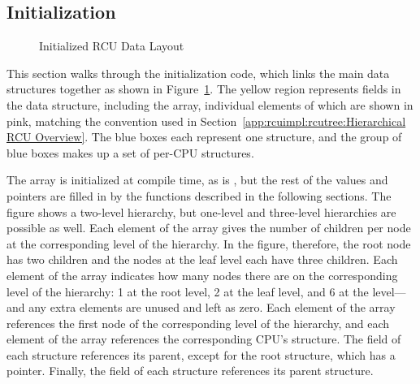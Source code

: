 \subsection{Initialization}
\label{app:rcuimpl:rcutreewt:Initialization}

\begin{figure}[tb]
\begin{center}
\end{center}
\caption{Initialized RCU Data Layout}
\label{fig:app:rcuimpl:rcutree:Initialized RCU Data Layout}
\end{figure}

This section walks through the initialization code, which links the
main data structures together as shown in
Figure~\ref{fig:app:rcuimpl:rcutree:Initialized RCU Data Layout}.
The yellow region represents fields in the  data
structure, including the  array, individual elements
of which are shown in pink, matching the convention used in
Section~\ref{app:rcuimpl:rcutree:Hierarchical RCU Overview}.
The blue boxes each represent one  structure,
and the group of blue boxes makes up a set of per-CPU 
structures.

The  array is initialized at compile time, as is
, but the rest of the values and pointers are filled
in by the functions described in the following sections.
The figure shows a two-level hierarchy, but one-level and three-level
hierarchies are possible as well.
Each element of the  array gives the number of
children per node at the corresponding level of the hierarchy.
In the figure, therefore, the root node has two children and the
nodes at the leaf level each have three children.
Each element of the  array indicates how many nodes
there are on the corresponding level of the hierarchy: 1 at the root
level, 2 at the leaf level, and 6 at the  level---and any
extra elements are unused and left as zero.
Each element of the  array references the first
node of the corresponding level of the  hierarchy,
and each element of the  array references the corresponding
CPU's  structure.
The  field of each  structure references
its parent, except for the root  structure, which
has a   pointer.
Finally, the  field of each  structure
references its parent  structure.

